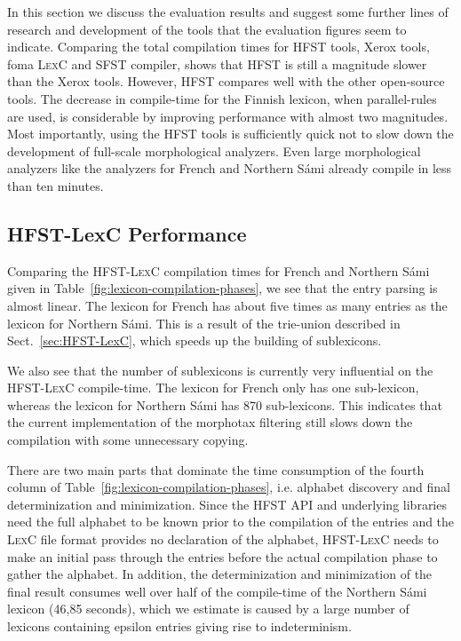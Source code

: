 \documentclass[a4paper]{article}
\begin{document}
In this section we discuss the evaluation results and suggest some
further lines of research and development of the tools that the
evaluation figures seem to indicate. Comparing the total compilation
times for \textsc{HFST} tools, Xerox tools, foma \textsc{LexC} and
\textsc{SFST} compiler, shows that \textsc{HFST} is still a magnitude
slower than the Xerox tools. However, \textsc{HFST} compares well with
the other open-source tools. The decrease in compile-time for the
Finnish lexicon, when parallel-rules are used, is considerable by
improving performance with almost two magnitudes. Most importantly,
using the \textsc{HFST} tools is sufficiently quick not to slow down
the development of full-scale morphological analyzers. Even large
morphological analyzers like the analyzers for French and Northern
S\'ami already compile in less than ten minutes.

\subsection{HFST-LexC Performance} 

Comparing the \textsc{HFST-LexC} compilation times for French and
Northern S\'ami given in Table~\ref{fig:lexicon-compilation-phases},
we see that the entry parsing is almost linear. The lexicon for French
has about five times as many entries as the lexicon for Northern
S\'ami. This is a result of the trie-union described in
Sect.~\ref{sec:HFST-LexC}, which speeds up the building of
sublexicons.

We also see that the number of sublexicons is currently very
influential on the \textsc{HFST-LexC} compile-time. The lexicon for
French only has one sub-lexicon, whereas the lexicon for Northern
S\'ami has 870 sub-lexicons. This indicates that the current
implementation of the morphotax filtering still slows down the
compilation with some unnecessary copying.

There are two main parts that dominate the time consumption of the
fourth column of Table~\ref{fig:lexicon-compilation-phases},
i.e. alphabet discovery and final determinization and minimization.
Since the \textsc{HFST} API and underlying libraries need the full
alphabet to be known prior to the compilation of the entries and the
\textsc{LexC} file format provides no declaration of the alphabet,
\textsc{HFST-LexC} needs to make an initial pass through the entries
before the actual compilation phase to gather the alphabet.  In
addition, the determinization and minimization of the final result
consumes well over half of the compile-time of the Northern S\'ami
lexicon (46,85 seconds), which we estimate is caused by a large number
of lexicons containing epsilon entries giving rise to indeterminism.
\end{document}

